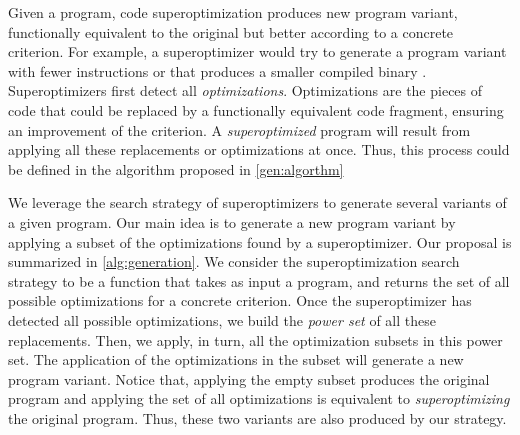 Given a program, code superoptimization produces new program variant, functionally equivalent to the original but better according to a concrete criterion. For example, a superoptimizer would try to generate a program variant with fewer instructions or that produces a smaller compiled binary \cite{1987_Massalin_Sueroptimizer}. Superoptimizers first detect all \emph{optimizations}. Optimizations are the pieces of code that could be replaced by a functionally equivalent code fragment, ensuring an improvement of the criterion. A \emph{superoptimized} program will result from applying all these replacements or optimizations at once. Thus, this process could be defined in the algorithm proposed in \autoref{gen:algorthm}


We leverage the search strategy of superoptimizers to generate several variants of a given program. Our main idea is to generate a new program variant by applying a subset of the optimizations found by a superoptimizer. Our proposal is summarized in \autoref{alg:generation}. We consider the superoptimization search strategy to be a function that takes as input a program, and returns the set of all possible optimizations for a concrete criterion. Once the superoptimizer has detected all possible optimizations, we build the \emph{power set} of all these replacements. Then, we apply, in turn, all the optimization subsets in this power set. The application of the optimizations in the subset will generate a new program variant. Notice that, applying the empty subset produces the original program and applying the set of all optimizations is equivalent to \emph{superoptimizing} the original program. Thus, these two variants are also produced by our strategy.






